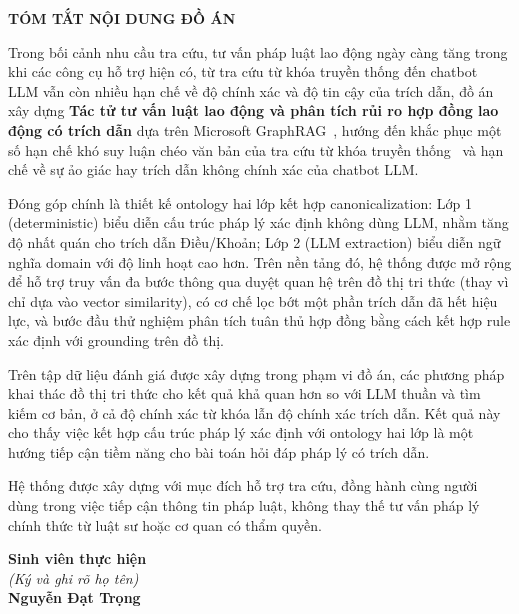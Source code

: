 \documentclass[../DoAn.tex]{subfiles}
\begin{document}
\begin{center}
    \Large{\textbf{TÓM TẮT NỘI DUNG ĐỒ ÁN}}\\
\end{center}


\vspace{0.8cm}

Trong bối cảnh nhu cầu tra cứu, tư vấn pháp luật lao động ngày càng tăng trong khi các công cụ hỗ trợ hiện có, từ tra cứu từ khóa truyền thống đến chatbot LLM vẫn còn nhiều hạn chế về độ chính xác và độ tin cậy của trích dẫn, đồ án xây dựng \textbf{Tác tử tư vấn luật lao động và phân tích rủi ro hợp đồng lao động có trích dẫn} dựa trên Microsoft \gls{GraphRAG}~\cite{graphrag2024}, hướng đến khắc phục một số hạn chế khó suy luận chéo văn bản của tra cứu từ khóa truyền thống~\cite{robertson1994bm25} và hạn chế về sự ảo giác hay trích dẫn không chính xác của chatbot LLM.

Đóng góp chính là thiết kế ontology hai lớp kết hợp canonicalization: Lớp 1 (deterministic) biểu diễn cấu trúc pháp lý xác định không dùng LLM, nhằm tăng độ nhất quán cho trích dẫn Điều/Khoản; Lớp 2 (LLM extraction) biểu diễn ngữ nghĩa domain với độ linh hoạt cao hơn. Trên nền tảng đó, hệ thống được mở rộng để hỗ trợ truy vấn đa bước thông qua duyệt quan hệ trên đồ thị tri thức (thay vì chỉ dựa vào vector similarity), có cơ chế lọc bớt một phần trích dẫn đã hết hiệu lực, và bước đầu thử nghiệm phân tích tuân thủ hợp đồng bằng cách kết hợp rule xác định với grounding trên đồ thị.

Trên tập dữ liệu đánh giá được xây dựng trong phạm vi đồ án, các phương pháp khai thác đồ thị tri thức cho kết quả khả quan hơn so với LLM thuần và tìm kiếm cơ bản, ở cả độ chính xác từ khóa lẫn độ chính xác trích dẫn. Kết quả này cho thấy việc kết hợp cấu trúc pháp lý xác định với ontology hai lớp là một hướng tiếp cận tiềm năng cho bài toán hỏi đáp pháp lý có trích dẫn.

Hệ thống được xây dựng với mục đích hỗ trợ tra cứu, đồng hành cùng người dùng trong việc tiếp cận thông tin pháp luật, không thay thế tư vấn pháp lý chính thức từ luật sư hoặc cơ quan có thẩm quyền.

\vspace{1.5cm}

\begin{flushright}
\textbf{Sinh viên thực hiện}\\[0.1cm]
\textit{(Ký và ghi rõ họ tên)}\\[2.5cm]
\textbf{Nguyễn Đạt Trọng}
\end{flushright}
\end{document}
